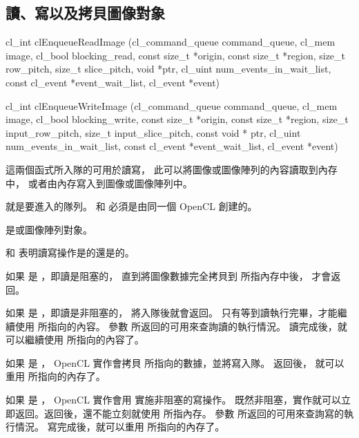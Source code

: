 \subsection{讀、寫以及拷貝圖像對象}



\startCLFUNC
cl_int clEnqueueReadImage (cl_command_queue command_queue,
			cl_mem image,
			cl_bool blocking_read,
			const size_t *origin,
			const size_t *region,
			size_t row_pitch,
			size_t slice_pitch,
			void *ptr,
			cl_uint num_events_in_wait_list,
			const cl_event *event_wait_list,
			cl_event *event)

cl_int clEnqueueWriteImage (cl_command_queue command_queue,
			cl_mem image,
			cl_bool blocking_write,
			const size_t *origin,
			const size_t *region,
			size_t input_row_pitch,
			size_t input_slice_pitch,
			const void * ptr,
			cl_uint num_events_in_wait_list,
			const cl_event *event_wait_list,
			cl_event *event)
\stopCLFUNC

這兩個函式所入隊的可用於讀寫，
此可以將圖像或圖像陣列的內容讀取到內存中，
或者由內存寫入到圖像或圖像陣列中。

 就是要進入的隊列。
 和  必須是由同一個 OpenCL 創建的。

 是或圖像陣列對象。

 和 
表明讀寫操作是{}的還是{}的。

如果  是 ，即讀是阻塞的，
直到將圖像數據完全拷貝到  所指內存中後，  才會返回。

如果  是 ，即讀是非阻塞的，
 將入隊後就會返回。
只有等到讀執行完畢，才能繼續使用  所指向的內容。
參數  所返回的可用來查詢讀的執行情況。
讀完成後，就可以繼續使用  所指向的內容了。

如果  是 ，
OpenCL 實作會拷貝  所指向的數據，並將寫入隊。
 返回後，
就可以重用  所指向的內存了。

如果  是 ，
OpenCL 實作會用  實施非阻塞的寫操作。
既然非阻塞，實作就可以立即返回。返回後，還不能立刻就使用  所指內存。
參數  所返回的可用來查詢寫的執行情況。
寫完成後，就可以重用  所指向的內存了。

